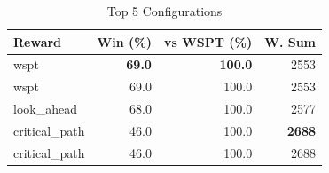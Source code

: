 \begin{table}[htbp]%
\centering%
\begin{tabular}{lrrr}%
\toprule%
\textbf{Reward}&\textbf{Win (\%)}&\textbf{vs WSPT (\%)}&\textbf{W. Sum}\\%
\midrule%
wspt&\textbf{69.0}&\textbf{100.0}&2553\\%
wspt&69.0&100.0&2553\\%
look_ahead&68.0&100.0&2577\\%
critical_path&46.0&100.0&\textbf{2688}\\%
critical_path&46.0&100.0&2688\\%
\bottomrule%
\end{tabular}%
\caption{Top 5 Configurations}%
\label{tab:summary}%
\end{table}